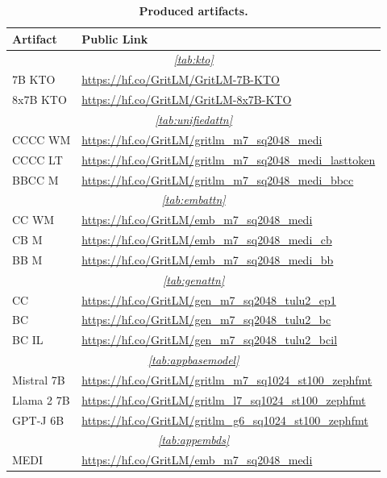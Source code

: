\documentclass{article}
\newcommand{\llama}{Llama}
\begin{document}
\begin{longtable}{p{2.9cm} p{10.2cm}}%
\caption{\textbf{Produced artifacts.}} \\
\toprule
Artifact & Public Link\\
\midrule
\multicolumn{2}{c}{\textit{\autoref{tab:kto}}} \\
\midrule
7B KTO & \url{https://hf.co/GritLM/GritLM-7B-KTO} \\
8x7B KTO & \url{https://hf.co/GritLM/GritLM-8x7B-KTO} \\
\midrule
\multicolumn{2}{c}{\textit{\autoref{tab:unifiedattn}}} \\
\midrule
CCCC WM & \url{https://hf.co/GritLM/gritlm_m7_sq2048_medi} \\
CCCC LT & \url{https://hf.co/GritLM/gritlm_m7_sq2048_medi_lasttoken} \\
BBCC M & \url{https://hf.co/GritLM/gritlm_m7_sq2048_medi_bbcc} \\
\midrule
\multicolumn{2}{c}{\textit{\autoref{tab:embattn}}} \\
\midrule
CC WM & \url{https://hf.co/GritLM/emb_m7_sq2048_medi} \\
CB M & \url{https://hf.co/GritLM/emb_m7_sq2048_medi_cb} \\
BB M &  \url{https://hf.co/GritLM/emb_m7_sq2048_medi_bb} \\
\midrule
\multicolumn{2}{c}{\textit{\autoref{tab:genattn}}} \\
\midrule
CC & \url{https://hf.co/GritLM/gen_m7_sq2048_tulu2_ep1} \\
BC & \url{https://hf.co/GritLM/gen_m7_sq2048_tulu2_bc} \\
BC IL & \url{https://hf.co/GritLM/gen_m7_sq2048_tulu2_bcil} \\
\midrule
\multicolumn{2}{c}{\textit{\autoref{tab:appbasemodel}}} \\
\midrule
Mistral 7B & \url{https://hf.co/GritLM/gritlm_m7_sq1024_st100_zephfmt} \\
\llama{} 2 7B & \url{https://hf.co/GritLM/gritlm_l7_sq1024_st100_zephfmt} \\
GPT-J 6B & \url{https://hf.co/GritLM/gritlm_g6_sq1024_st100_zephfmt} \\
\midrule
\multicolumn{2}{c}{\textit{\autoref{tab:appembds}}} \\
\midrule
MEDI & \url{https://hf.co/GritLM/emb_m7_sq2048_medi} \\

\end{longtable}
\end{document}
